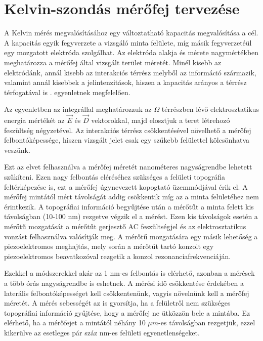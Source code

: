\chapter{Kelvin-szondás mérőfej tervezése}

A Kelvin mérés megvalósításához egy változtatható kapacitás megvalósítása a cél. A kapacitás egyik fegyverzete a vizsgáló minta felülete, míg másik fegyverzetéül egy mozgatott elektróda szolgálhat. Az elektróda alakja és mérete nagymértékben meghatározza a mérőfej által vizsgált terület méretét. Minél kisebb az elektródánk, annál kisebb az interakciós térrész melyből az információ származik, valamint annál kisebbek a jelintenzitások, hiszen a kapacitás arányos a térrész térfogatával is . egyenletnek megfelelően.


Az egyenletben az integrállal meghatározzuk az $\Omega$ térrészben lévő elektrosztatikus energia mértékét az $\vec{E}$ és $\vec{D}$ vektorokkal, majd elosztjuk a teret létrehozó feszültség négyzetével. Az interakciós térrész csökkentésével növelhető a mérőfej felbontóképessége, hiszen vizsgált jelet csak egy szűkebb felülettel kölcsönhatva veszünk.

Ezt az elvet felhasználva a mérőfej méretét nanométeres nagyságrendbe lehetett szűkíteni\cite{KPFM_1}. Ezen nagy felbontás eléréséhez szükséges a felületi topográfia feltérképezése is, ezt a mérőfej úgynevezett kopogtató üzemmódjával érik el. A mérőfej mintától mért távolságát addig csökkentik míg az a minta felületéhez nem érintkezik. A topográfiai információ begyűjtése után a mérőtűt a minta felett kis távolságban (10-100 nm) rezgetve végzik el a mérést. Ezen kis távolságok esetén a mérőtű mozgatását a mérőtűt gerjesztő AC feszültségjel és az elektrosztatikus vonzást felhasználva valósítják meg. A mérőtű mozgatására egy másik lehetőség a piezoelektromos meghajtás\cite{KPFM_2}, mely során a mérőtűt tartó konzolt egy piezoelektromos beavatkozóval rezgetik a konzol rezonanciafrekvenciáján.

Ezekkel a módszerekkel akár az 1 nm-es felbontás is elérhető, azonban a mérések a több órás nagyságrendbe is eshetnek\cite{KPFM_2}. A mérési idő csökkentése érdekében a laterális felbontóképességet kell csökkentenünk, vagyis növelnünk kell a mérőfej méretét. A mérés sebességét az is gyorsítja, ha a felületről nem szükséges topográfiai információ gyűjtése, hogy a mérőfej ne ütközzön bele a mintába. Ez elérhető, ha a mérőfejet a mintától néhány 10 $\mu m$-es távolságban rezgetjük, ezzel kikerülve az esetleges pár száz nm-es felületi egyenetlenségeket.

